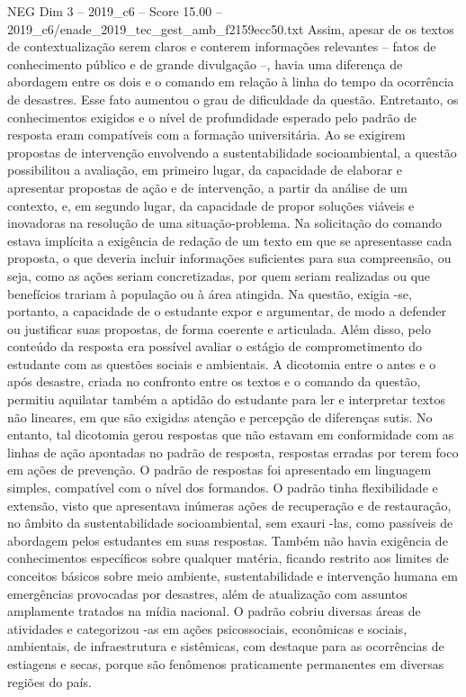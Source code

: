 \begin{textsample}{NEG Dim 3 – 2019\_c6 – Score 15.00 – 2019\_c6/enade\_2019\_tec\_gest\_amb\_f2159ecc50.txt}
Assim, apesar de os textos de contextualização serem claros e conterem informações relevantes – fatos de conhecimento público e de grande divulgação –, havia uma diferença de abordagem entre os dois e o comando em relação à linha do tempo da ocorrência de desastres.
Esse fato aumentou o grau de dificuldade da questão.
Entretanto, os conhecimentos exigidos e o nível de profundidade esperado pelo padrão de resposta eram compatíveis com a formação universitária.
Ao se exigirem propostas de intervenção envolvendo a sustentabilidade socioambiental, a questão possibilitou a avaliação, em primeiro lugar, da capacidade de elaborar e apresentar propostas de ação e de intervenção, a partir da análise de um contexto, e, em segundo lugar, da capacidade de propor soluções viáveis e inovadoras na resolução de uma situação-problema.
Na solicitação do comando estava implícita a exigência de redação de um texto em que se apresentasse cada proposta, o que deveria incluir informações suficientes para sua compreensão, ou seja, como as ações seriam concretizadas, por quem seriam realizadas ou que benefícios trariam à população ou à área atingida.
Na questão, exigia -se, portanto, a capacidade de o estudante expor e argumentar, de modo a defender ou justificar suas propostas, de forma coerente e articulada.
Além disso, pelo conteúdo da resposta era possível avaliar o estágio de comprometimento do estudante com as questões sociais e ambientais.
A dicotomia entre o antes e o após desastre, criada no confronto entre os textos e o comando da questão, permitiu aquilatar também a aptidão do estudante para ler e interpretar textos não lineares, em que são exigidas atenção e percepção de diferenças sutis.
No entanto, tal dicotomia gerou respostas que não estavam em conformidade com as linhas de ação apontadas no padrão de resposta, respostas erradas por terem foco em ações de prevenção.
O padrão de respostas foi apresentado em linguagem simples, compatível com o nível dos formandos.
O padrão tinha flexibilidade e extensão, visto que apresentava inúmeras ações de recuperação e de restauração, no âmbito da sustentabilidade socioambiental, sem exauri -las, como passíveis de abordagem pelos estudantes em suas respostas.
Também não havia exigência de conhecimentos específicos sobre qualquer matéria, ficando restrito aos limites de conceitos básicos sobre meio ambiente, sustentabilidade e intervenção humana em emergências provocadas por desastres, além de atualização com assuntos amplamente tratados na mídia nacional.
O padrão cobriu diversas áreas de atividades e categorizou -as em ações psicossociais, econômicas e sociais, ambientais, de infraestrutura e sistêmicas, com destaque para as ocorrências de estiagens e secas, porque são fenômenos praticamente permanentes em diversas regiões do país.

\end{textsample}
